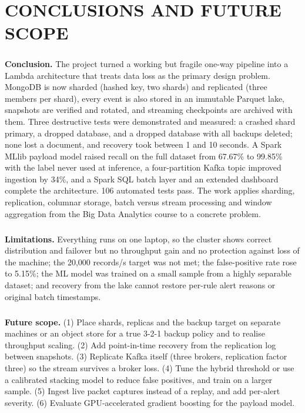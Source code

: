 \chapter{CONCLUSIONS AND FUTURE SCOPE}

\paragraph{}
\textbf{Conclusion.} The project turned a working but fragile one-way pipeline into a Lambda architecture that treats data loss as the primary design problem. MongoDB is now sharded (hashed key, two shards) and replicated (three members per shard), every event is also stored in an immutable Parquet lake, snapshots are verified and rotated, and streaming checkpoints are archived with them. Three destructive tests were demonstrated and measured: a crashed shard primary, a dropped database, and a dropped database with all backups deleted; none lost a document, and recovery took between 1 and 10 seconds. A Spark MLlib payload model raised recall on the full dataset from 67.67\% to 99.85\% with the label never used at inference, a four-partition Kafka topic improved ingestion by 34\%, and a Spark SQL batch layer and an extended dashboard complete the architecture. 106 automated tests pass. The work applies sharding, replication, columnar storage, batch versus stream processing and window aggregation from the Big Data Analytics course to a concrete problem.

\paragraph{}
\textbf{Limitations.} Everything runs on one laptop, so the cluster shows correct distribution and failover but no throughput gain and no protection against loss of the machine; the 20,000 records/s target was not met; the false-positive rate rose to 5.15\%; the ML model was trained on a small sample from a highly separable dataset; and recovery from the lake cannot restore per-rule alert reasons or original batch timestamps.

\paragraph{}
\textbf{Future scope.} (1) Place shards, replicas and the backup target on separate machines or an object store for a true 3-2-1 backup policy and to realise throughput scaling. (2) Add point-in-time recovery from the replication log between snapshots. (3) Replicate Kafka itself (three brokers, replication factor three) so the stream survives a broker loss. (4) Tune the hybrid threshold or use a calibrated stacking model to reduce false positives, and train on a larger sample. (5) Ingest live packet captures instead of a replay, and add per-alert severity. (6) Evaluate GPU-accelerated gradient boosting for the payload model.

